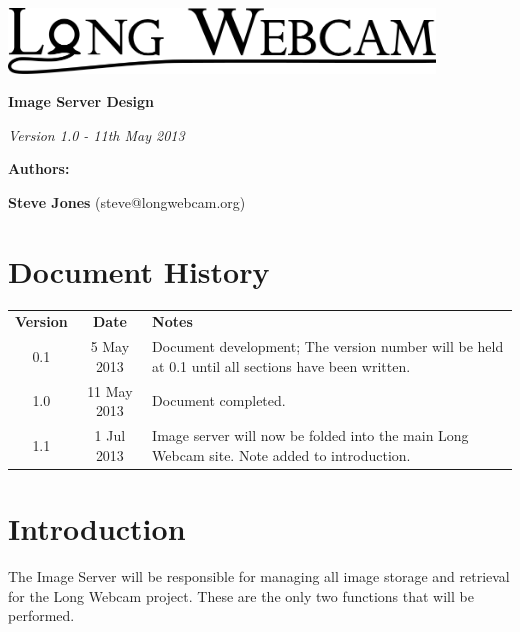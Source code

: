 \documentclass[11pt]{article}
\begin{document}
\begin{titlepage}
\begin{center}

\includegraphics[width=0.85\textwidth]{./Logo_Large-cropped_black.png}

\vspace{3 cm}

\textbf{\Huge{Image Server Design}}

\vspace{1 cm}

\textit{\large{Version 1.0 - 11th May 2013}}

\vspace{4 cm}

\textbf{\Large{Authors:}}

\textbf{Steve Jones} (steve@longwebcam.org)

\end{center}

\end{titlepage}

\setcounter{tocdepth}{2}
\tableofcontents
\clearpage
{}
\section*{Document History}
\begin{table}[tbhp!]
\begin{tabular}{ c c p{4in} }
\textbf{Version} & \textbf{Date} & \textbf{Notes} \\
0.1 & 5 May 2013 & Document development; The version number will be held at 0.1 until all sections have been written. \\
1.0 & 11 May 2013 & Document completed. \\
1.1 & 1 Jul 2013 & Image server will now be folded into the main Long Webcam site. Note added to introduction.
\end{tabular}
\end{table}

\clearpage
{}


\section{Introduction}
The Image Server will be responsible for managing all image storage and retrieval for the Long Webcam project. These are the only two functions that will be performed.
\end{document}
